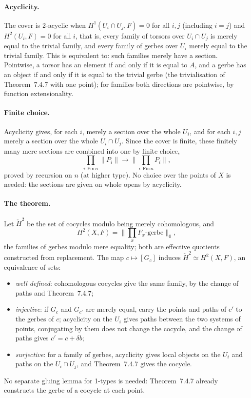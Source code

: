 \documentclass[11pt]{article}
\newcommand{\tr}[1]{\lVert #1\rVert}
\theoremstyle{remark}
\begin{document}
\paragraph{Acyclicity.} The cover is 2-acyclic when $H^1(U_i\cap U_j,F)=0$
for all $i,j$ (including $i=j$) and $H^2(U_i,F)=0$ for all $i$, that is,
every family of torsors over $U_i\cap U_j$ is merely equal to the
trivial family, and every family of gerbes over $U_i$ merely equal to
the trivial family. This is equivalent to: such families merely have a
section. Pointwise, a torsor has an element if and only if it is equal
to $A$, and a gerbe has an object if and only if it is equal to the
trivial gerbe (the trivialisation of Theorem~7.4.7 with one point); for
families both directions are pointwise, by function extensionality.

\paragraph{Finite choice.} Acyclicity gives, for each $i$, merely a
section over the whole $U_i$, and for each $i,j$ merely a section over
the whole $U_i\cap U_j$. Since the cover is finite, these finitely many
mere sections are combined into one by finite choice,
\[
  \textstyle\prod_{i:\mathrm{Fin}\,n}\tr{P_i}\to\tr{\prod_{i:\mathrm{Fin}\,n}P_i},
\]
proved by recursion on $n$ (at higher type). No choice over the points
of $X$ is needed: the sections are given on whole opens by acyclicity.

\paragraph{The theorem.} Let $\check H^2$ be the set of cocycles modulo
being merely cohomologous, and
\[
  \textstyle H^2(X,F)=\tr{\prod_x F_x\text{-gerbe}}_0,
\]
the families of gerbes modulo mere equality; both are effective quotients
constructed from replacement. The map $c\mapsto[G_c]$ induces
$\check H^2\simeq H^2(X,F)$, an equivalence of sets:
\begin{itemize}
\item \emph{well defined}: cohomologous cocycles give the same family,
  by the change of paths and Theorem~7.4.7;
\item \emph{injective}: if $G_c$ and $G_{c'}$ are merely equal, carry
  the points and paths of $c'$ to the gerbes of $c$; acyclicity on the
  $U_i$ gives paths between the two systems of points, conjugating by
  them does not change the cocycle, and the change of paths gives
  $c'=c+\delta b$;
\item \emph{surjective}: for a family of gerbes, acyclicity gives local
  objects on the $U_i$ and paths on the $U_i\cap U_j$, and
  Theorem~7.4.7 gives the cocycle.
\end{itemize}
No separate gluing lemma for 1-types is needed: Theorem~7.4.7 already
constructs the gerbe of a cocycle at each point.
\end{document}
